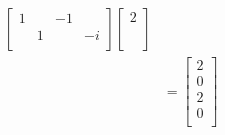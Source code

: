 \documentclass[a4paper]{article}
\begin{document}
\begin{align*}
\begin{bmatrix}
		1 &  & -1 & \\
		 & 1 &  & -i \\
	\end{bmatrix} 
	\begin{bmatrix}
		2 \\
		\\
		\\
		\\
	\end{bmatrix} \\
		& = \begin{bmatrix}
			2 \\
			0 \\
			2 \\
			0 \\
		\end{bmatrix}
\end{align*}
\end{document}
